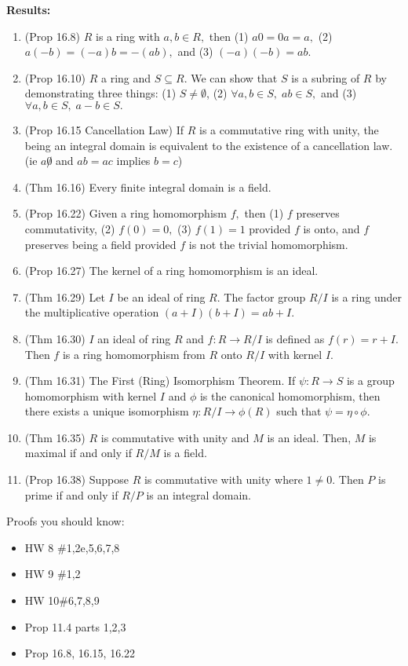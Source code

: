 \documentclass[12pt]{article}
\begin{document}
\noindent \textbf{Results:} \\
\begin{enumerate}
	\item (Prop 16.8) $R$ is a ring with $a,b \in R,$ then (1) $a0=0a=a,$ (2) $a(-b)=(-a)b=-(ab),$ and (3) $(-a)(-b)=ab.$
	\item (Prop 16.10) $R$ a ring and $S \subseteq R$. We can show that $S$ is a subring of $R$ by demonstrating three things: (1) $S \not = \emptyset$, (2) $\forall a,b \in S, \; ab \in S,$ and (3)  $\forall a,b \in S, \; a-b \in S.$
	\item  (Prop 16.15 Cancellation Law) If $R$ is a commutative ring with unity, the being an integral domain is equivalent to the existence of a cancellation law. (ie $a \not 0$ and $ab=ac$ implies $b=c$)
	\item (Thm 16.16) Every finite integral domain is a field.
	\item (Prop 16.22) Given a ring  homomorphism $f,$ then (1) $f$ preserves commutativity, (2) $f(0)=0,$ (3) $f(1)=1$ provided $f$ is onto, and $f$ preserves being a field provided $f$ is not the trivial homomorphism.
	\item (Prop 16.27) The kernel of a ring homomorphism is an ideal.
	\item (Thm 16.29) Let $I$ be an ideal of ring $R.$ The factor group $R/I$ is a ring under the multiplicative operation $(a+I)(b+I)=ab+I.$
	\item (Thm 16.30) $I$ an ideal of ring $R$ and $f: R \to R/I$ is defined as $f(r)=r+I.$ Then $f$ is a ring homomorphism from $R$ onto $R/I$ with kernel $I.$
	\item (Thm 16.31) The First (Ring) Isomorphism Theorem. If $\psi: R \to S$ is a group homomorphism with kernel $I$ and $\phi$ is the canonical homomorphism, then there exists a unique isomorphism $\eta: R/I \to \phi(R)$ such that $\psi=\eta \circ \phi.$
	\item (Thm 16.35) $R$ is commutative with unity and $M$ is an ideal. Then, $M$ is maximal if and only if $R/M$ is a field.
	\item (Prop 16.38) Suppose $R$ is commutative with unity where $1 \not = 0.$ Then $P$ is prime if and only if $R/P$ is an integral domain.
\end{enumerate}

Proofs you should know: \\
\begin{itemize}
	\item HW 8 \#1,2e,5,6,7,8
	\item HW 9 \#1,2
	\item HW 10\#6,7,8,9
	\item Prop 11.4 parts 1,2,3
	\item Prop 16.8, 16.15, 16.22
\end{itemize}
\end{document}

